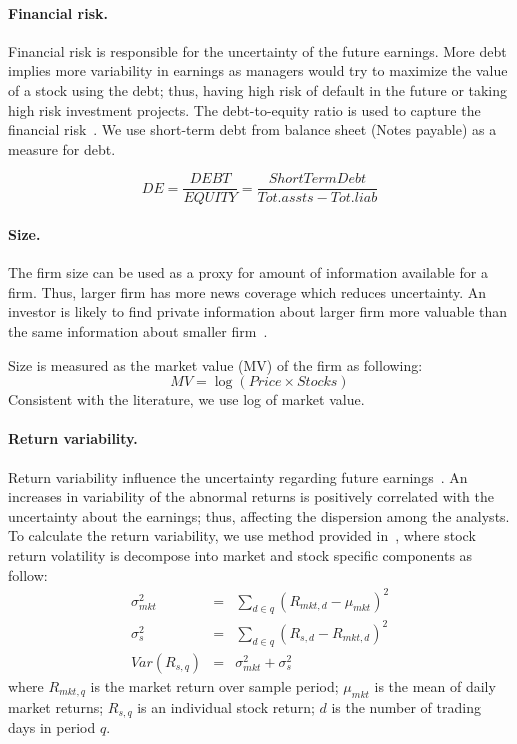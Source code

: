 \paragraph{Financial risk.} Financial risk is responsible for the uncertainty of the future earnings. More debt implies more variability in earnings as managers would try to maximize the value of a stock using the debt; thus, having high risk of default in the future or taking high risk investment projects. The debt-to-equity ratio is used to capture the financial risk~\citep{parkash1995}. We use short-term debt from balance sheet (Notes payable) as a measure for debt.

\begin{equation}
DE=\frac{DEBT}{EQUITY}=\frac{ShortTermDebt}{Tot.assts-Tot.liab}
\end{equation}

\paragraph{Size.} The firm size can be used as a proxy for amount of information available for a firm. Thus, larger firm has more news coverage which reduces uncertainty. An investor is likely to find private information about larger firm more valuable than the same information about smaller firm~\citep{bhushan1989}.

Size is measured as the market value (MV) of the firm as following:
\begin{equation}
MV= \log(Price \times Stocks)
\end{equation}
Consistent with the literature, we use log of market value.


\paragraph{Return variability.}
Return variability influence the uncertainty regarding future earnings~\citep{diether2002,henley2003}. An increases in variability of the abnormal returns is positively correlated with the uncertainty about the earnings; thus, affecting the dispersion among the analysts. To calculate the return variability, we use method provided in~\cite{sousa2008}, where stock return volatility is decompose into market and stock specific components as follow:
\begin{eqnarray}
\sigma^2_{mkt}&=&\sum_{d\in q} (R_{mkt,d}-\mu_{mkt})^2 \nonumber \\
\sigma^2_{s}&=&\sum_{d \in q} (R_{s,d}-R_{mkt,d})^2 \nonumber \\
Var (R_{s,q})&=&\sigma^2_{mkt}+\sigma^2_{s} \label{ch3-eq:ret.vol}
\end{eqnarray}
where $R_{mkt,q}$ is the market return over sample period; $\mu_{mkt}$ is the mean of daily market returns; $R_{s,q}$ is an individual stock return; $d$ is the number of trading days in period $q$.

